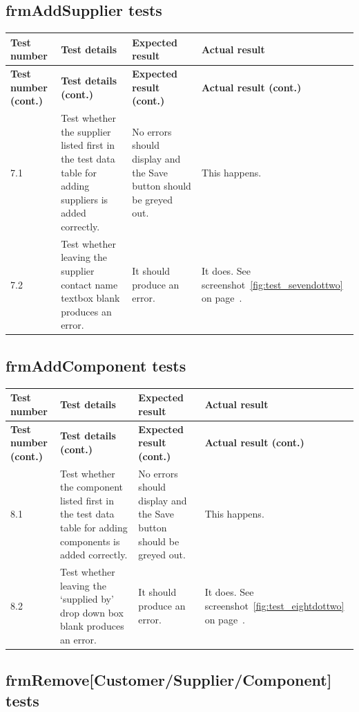 \subsection{frmAddSupplier tests}

\begin{longtable}{ | p{2cm} | p{4cm} | p{4cm} | p{4cm} | }
	\hline
	\textbf{Test number} & \textbf{Test details} & \textbf{Expected result} & \textbf{Actual result}\\
	\endfirsthead
	\hline
	\textbf{Test number (cont.)} & \textbf{Test details (cont.)} & \textbf{Expected result (cont.)} & \textbf{Actual result (cont.)}\\
	\endhead
	\hline
	7.1 & Test whether the supplier listed first in the test data table for adding suppliers is added correctly. & No errors should display and the Save button should be greyed out. & This happens.\\
	\hline
	7.2 & Test whether leaving the supplier contact name textbox blank produces an error. & It should produce an error. & It does.  See screenshot~\ref{fig:test_sevendottwo} on page~\pageref{fig:test_sevendottwo}.\\
	\hline
\end{longtable}

\subsection{frmAddComponent tests}

 \begin{longtable}{ | p{2cm} | p{4cm} | p{4cm} | p{4cm} | }
	\hline
	\textbf{Test number} & \textbf{Test details} & \textbf{Expected result} & \textbf{Actual result}\\
	\endfirsthead
	\hline
	\textbf{Test number (cont.)} & \textbf{Test details (cont.)} & \textbf{Expected result (cont.)} & \textbf{Actual result (cont.)}\\
	\endhead
	\hline
	8.1 & Test whether the component listed first in the test data table for adding components is added correctly. & No errors should display and the Save button should be greyed out. & This happens.\\
	\hline
	8.2 & Test whether leaving the `supplied by' drop down box blank produces an error. & It should produce an error. & It does.  See screenshot~\ref{fig:test_eightdottwo} on page~\pageref{fig:test_eightdottwo}.\\
	\hline
\end{longtable}

\subsection{frmRemove[Customer\slash Supplier\slash Component] tests}

